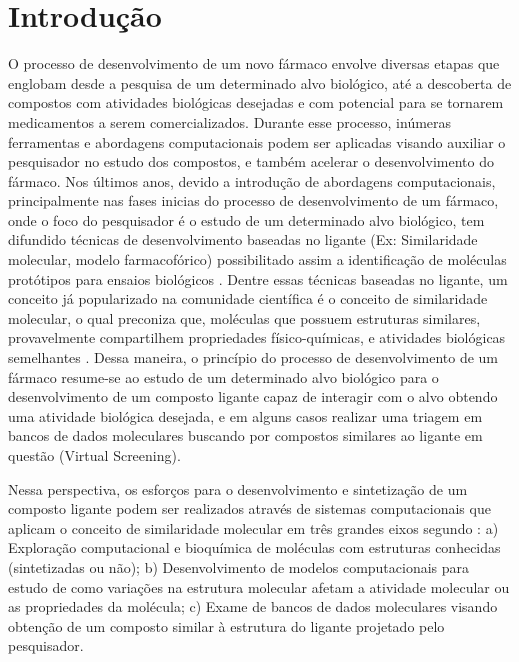 \chapter{Introdu\c{c}\~ao}
O processo de desenvolvimento de um novo fármaco envolve diversas etapas que englobam desde a pesquisa de um determinado alvo biológico, até a descoberta de compostos com atividades biológicas desejadas e com potencial para se tornarem medicamentos a serem comercializados. Durante esse processo, inúmeras ferramentas e abordagens computacionais podem ser aplicadas visando auxiliar o pesquisador no estudo dos compostos, e também acelerar o desenvolvimento do fármaco. Nos últimos anos, devido a introdução de abordagens computacionais, principalmente nas fases inicias do processo de desenvolvimento de um fármaco, onde o foco do pesquisador é o estudo de um determinado alvo biológico,  tem difundido técnicas de desenvolvimento baseadas no ligante (Ex: Similaridade molecular, modelo farmacofórico) possibilitado assim a identificação de moléculas protótipos para ensaios biológicos \cite{rodrigues2012}. Dentre essas técnicas baseadas no ligante, um conceito já popularizado na comunidade científica é o conceito de similaridade molecular, o qual preconiza que, moléculas que possuem estruturas similares, provavelmente compartilhem propriedades físico-químicas, e atividades biológicas semelhantes \cite{singh2004reasoning}. Dessa maneira, o princípio do processo de desenvolvimento de um fármaco resume-se ao estudo de um determinado alvo biológico para o desenvolvimento de um composto ligante capaz de interagir com o alvo obtendo uma atividade biológica desejada, e em alguns casos realizar uma triagem em bancos de dados moleculares buscando por compostos similares ao ligante em questão (Virtual Screening).

Nessa perspectiva, os esforços para o desenvolvimento e sintetização de um composto ligante podem ser realizados através de sistemas computacionais que aplicam o conceito de similaridade molecular em três grandes eixos segundo : a) Exploração computacional e bioquímica de moléculas com estruturas conhecidas (sintetizadas ou não); b) Desenvolvimento de modelos computacionais para estudo de como variações na estrutura molecular afetam a atividade molecular ou as propriedades da molécula; c) Exame de bancos de dados moleculares visando obtenção de um composto similar à estrutura do ligante projetado pelo pesquisador. 

